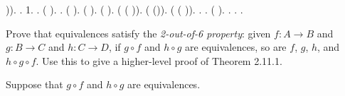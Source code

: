 \begin{coqdoccode}
\coqdocindent{1.00em}
)).\coqdoceol
\coqdocindent{1.00em}
 . \coqdoctac{\ensuremath{\exists}} 1. .\coqdoceol
\coqdocindent{1.00em}
 (\coqdocvar{\_}  \coqdocnotation{(} \coqdocnotation{\^{}}\coqdocnotation{)}). .\coqdoceol
\coqdocindent{1.00em}
 (\coqdocvar{\_}  \coqdocnotation{(} \coqdocvar{\_} \coqdocvar{\_}\coqdocnotation{)\^{}}).\coqdoceol
\coqdocindent{1.00em}
 (\coqdocvar{\_}  \coqdocnotation{(} \coqdocvar{\_}\coqdocnotation{)\^{}}).\coqdoceol
\coqdocindent{1.00em}
 (\coqdocvar{\_}  \coqdocnotation{(} \coqdocvar{\_} \coqdocvar{\_}\coqdocnotation{)}).  ( ( )).\coqdoceol
\coqdocindent{1.00em}
 (\coqdocvar{\_}  \coqdocnotation{(} \coqdocvar{\_} (\coqdocnotation{\^{}})\coqdocnotation{)}).  ( ( )).\coqdoceol
\coqdocindent{1.00em}
 \coqdocnotation{(} \coqdocvar{\_}\coqdocnotation{)\^{}}.\coqdoceol
\coqdocindent{1.00em}
\coqdoctac{\ensuremath{\exists}} .\coqdoceol
\coqdocemptyline
\coqdocindent{1.00em}
 (\coqdocnotation{(}  \coqdocvar{\_}\coqdocnotation{)}  \coqdocvar{\_}).\coqdoceol
\coqdocindent{1.00em}
.\coqdoceol
\coqdocnoindent
{}.\coqdoceol
\coqdocemptyline
\coqdocemptyline
\coqdocnoindent
{} .\coqdoceol
\coqdocemptyline
\end{coqdoccode}
Prove that equivalences satisfy the \textit{2-out-of-6 property}: given $f : A \to B$
and $g : B \to C$ and $h : C \to D$, if $g \circ f$ and $h \circ g$ are
equivalences, so are $f$, $g$, $h$, and $h \circ g \circ f$.  Use this to give
a higher-level proof of Theorem 2.11.1.


 \soln
Suppose that $g \circ f$ and $h \circ g$ are equivalences.



